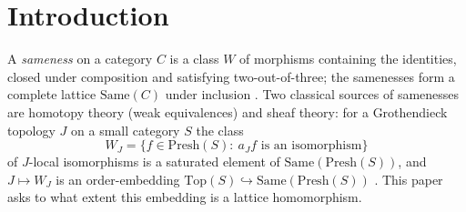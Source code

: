 \documentclass[11pt]{amsart}
\theoremstyle{definition}
\newcommand{\Same}{\mathrm{Same}}
\newcommand{\Top}{\mathrm{Top}}
\newcommand{\Presh}{\mathrm{Presh}}
\begin{document}
\maketitle

\section{Introduction}

A \emph{sameness} on a category $C$ is a class $W$ of morphisms containing the
identities, closed under composition and satisfying two-out-of-three; the
samenesses form a complete lattice $\Same(C)$ under inclusion
\cite{Same,Postnikov}. Two classical sources of samenesses are homotopy theory
(weak equivalences) and sheaf theory: for a Grothendieck topology $J$ on a
small category $S$ the class
\[
W_J=\{f\in\Presh(S):\ a_Jf\text{ is an isomorphism}\}
\]
of $J$-local isomorphisms is a saturated element of $\Same(\Presh(S))$, and
$J\mapsto W_J$ is an order-embedding $\Top(S)\hookrightarrow\Same(\Presh(S))$
\cite[Thm.~3.1]{Postnikov}. This paper asks to what extent this embedding is a
lattice homomorphism.
\end{document}
